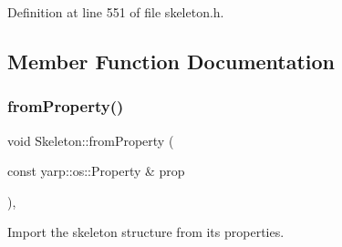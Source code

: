 Definition at line 551 of file skeleton.\+h.



\subsection{Member Function Documentation}
\mbox{\label{classassistive__rehab_1_1Skeleton_ac844f66503de87859833056dc33a835b}} 
\subsubsection{\texorpdfstring{fromProperty()}{fromProperty()}}
{\footnotesize\ttfamily void Skeleton\+::from\+Property (\begin{DoxyParamCaption}\item[{const yarp\+::os\+::\+Property \&}]{prop }\end{DoxyParamCaption})\hspace{0.3cm}{\ttfamily [virtual]}, {\ttfamily [inherited]}}



Import the skeleton structure from its properties. 


